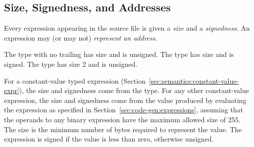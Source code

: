 \documentclass[10pt]{article}
\begin{document}
\subsection{Size, Signedness, and Addresses}
\label{sec:semantics:size}

Every expression appearing in the source file is given a \emph{size}
and a \emph{signedness}.  An expression may (or may not)
\emph{represent an address}.

 The type
 with no trailing  has size  and is
unsigned.  The type   has size  and
is signed.  The type  has size 2 and is unsigned.

  For a
constant-value typed expression
(Section~\ref{sec:semantics:constant-value-expr}), the size and
signedness come from the type.  For any other constant-value
expression, the size and signedness come from the value produced by
evaluating the expression as specified in
Section~\ref{sec:code-gen:expressions}, assuming that the operands to
any binary expression have the maximum allowed size of 255.  The size
is the minimum number of bytes required to represent the value.  The
expression is signed if the value is less than zero, otherwise
unsigned.
\end{document}
